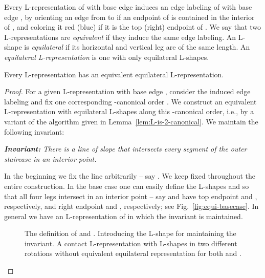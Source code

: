 \documentclass{llncs}
\begin{document}
Every L-representation of  with base edge  induces an edge labeling of  with base edge , by orienting an edge  from  to  if an endpoint of  is contained in the interior of , and coloring it red (blue) if it is the top (right) endpoint of . We say that two L-representations are \emph{equivalent} if they induce the same edge labeling. An L-shape is \emph{equilateral} if its horizontal and vertical leg are of the same length. An \emph{equilateral L-representation} is one with only equilateral L-shapes.
  
\begin{theorem}\label{th:equiL}
 Every L-representation has an equivalent equilateral L-representation.
\end{theorem}
\begin{proof}
 For a given L-representation with base edge , consider the induced edge labeling and fix one corresponding -canonical order . We construct an equivalent L-representation with equilateral L-shapes along this -canonical order, i.e., by a variant of the algorithm given in Lemma~\ref{lem:L-is-2-canonical}. We maintain the following invariant:
  
 \medskip
 \textit{{\bf Invariant:} 
  There is a line  of slope  that intersects every segment of the outer staircase in an interior point.
 }
 \medskip

 In the beginning we fix the line  arbitrarily -- say . We keep  fixed throughout the entire construction. In the base case one can easily define the L-shapes  and  so that all four legs intersect  in an interior point -- say  and  have top endpoint  and , respectively, and right endpoint  and , respectively; see Fig.~\ref{fig:equi-basecase}. In general we have an L-representation of  in which the invariant is maintained.

 \begin{figure}[t!]
\centering
  \hspace{1em}
  \hspace{0em}
  \caption{ The definition of  and .  Introducing the L-shape for  maintaining the invariant. 
A contact L-representation with L-shapes in two different rotations without equivalent equilateral representation for both  and .}
  \label{fig:equi}
 \end{figure}


\end{proof}
\end{document}
